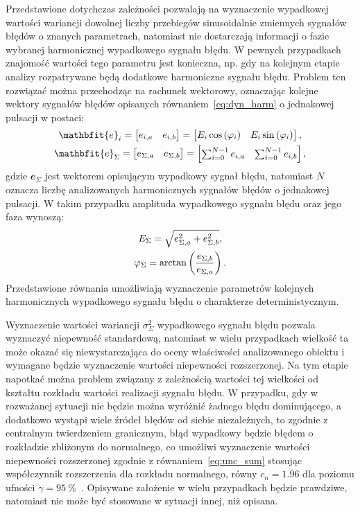 Przedstawione dotychczas zależności pozwalają na wyznaczenie wypadkowej wartości wariancji dowolnej liczby przebiegów sinusoidalnie zmiennych sygnałów błędów o znanych parametrach, natomiast nie dostarczają informacji o fazie wybranej harmonicznej wypadkowego sygnału błędu. W pewnych przypadkach znajomość wartości tego parametru jest konieczna, np. gdy na kolejnym etapie analizy rozpatrywane będą dodatkowe harmoniczne sygnału błędu. Problem ten rozwiązać można przechodząc na rachunek wektorowy, oznaczając kolejne wektory sygnałów błędów opisanych równaniem~\eqref{eq:dyn_harm} o jednakowej pulsacji w postaci:
\begin{gather}
\mathbfit{e}_{i} =
\begin{bmatrix}
e_{i,a} & e_{i,b}
\end{bmatrix}
=
\begin{bmatrix}
E_{i} \cos \emb{\varphi_{i}} & E_{i} \sin \emb{\varphi_{i}}
\end{bmatrix}
\label{eq:dyn_vect}, \\
\mathbfit{e}_{\Sigma} =
\begin{bmatrix}
e_{\Sigma,a} & e_{\Sigma,b}
\end{bmatrix}
=
\begin{bmatrix}
\sum _{i = 0} ^{N-1} e_{i,a} & \sum _{i = 0} ^{N-1} e_{i,b}
\end{bmatrix}
\label{eq:dyn_vect_sum},
\end{gather}
gdzie $\mathbfit{e}_{\Sigma}$ jest wektorem opisującym wypadkowy sygnał błędu, natomiast $N$ oznacza liczbę analizowanych harmonicznych sygnałów błędów o jednakowej pulsacji. W takim przypadku amplituda wypadkowego sygnału błędu oraz jego faza wynoszą:
\begin{gather}
E_{\Sigma} = \sqrt{e_{\Sigma,a}^{2} + e_{\Sigma,b}^{2}} \label{eq:dyn_vect_amp}, \\
\varphi_{\Sigma} = \arctan \left(\frac{e_{\Sigma,b}}{e_{\Sigma,a}}\right) \label{eq:dyn_vect_phi}.
\end{gather}
Przedstawione równania umożliwiają wyznaczenie parametrów kolejnych harmonicznych wypadkowego sygnału błędu o charakterze deterministycznym.

Wyznaczenie wartości wariancji $\sigma_{\Sigma}^{2}$ wypadkowego sygnału błędu pozwala wyznaczyć niepewność standardową, natomiast w wielu przypadkach wielkość ta może okazać się niewystarczająca do oceny właściwości analizowanego obiektu i wymagane będzie wyznaczenie wartości niepewności rozszerzonej. Na tym etapie napotkać można problem związany z zależnością wartości tej wielkości od kształtu rozkładu wartości realizacji sygnału błędu. W przypadku, gdy w rozważanej sytuacji nie będzie można wyróżnić żadnego błędu dominującego, a dodatkowo wystąpi wiele źródeł błędów od siebie niezależnych, to zgodnie z centralnym twierdzeniem granicznym, błąd wypadkowy będzie błędem o rozkładzie zbliżonym do normalnego, co umożliwi wyznaczenie wartości niepewności rozszerzonej zgodnie z równaniem~\eqref{eq:unc_sum} stosując współczynnik rozszerzenia dla rozkładu normalnego, równy $c_{n} = \num{1.96}$ dla poziomu ufności $\gamma = \qty{95}{\percent}$~\cite{jcgm_guide}. Opisywane założenie w wielu przypadkach będzie prawdziwe, natomiast nie może być stosowane w sytuacji innej, niż opisana.

